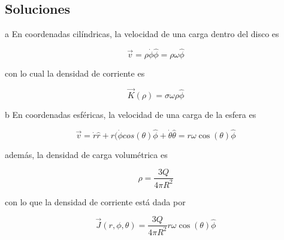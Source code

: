 \subsection{Soluciones}

\begin{solucion}{1}
\ics a
En coordenadas cilíndricas, la velocidad de una carga dentro del disco es

\[\Vec{v}=\rho\dot{\phi}\hat{\phi}=\rho\omega\hat{\phi}\]

con lo cual la densidad de corriente es

\[\Vec{K}(\rho) = \sigma\omega\rho\hat{\phi}\]

\ics b
En coordenadas esféricas, la velocidad de una carga de la esfera es

\[\Vec{v}=\dot{r}\hat{r} + r(\dot{\phi}cos(\theta)\hat{\phi}+\dot{\theta}\hat{\theta}=
r\omega\cos(\theta)\hat{\phi}\]

además, la densidad de carga volumétrica es

\[\rho = \frac{3Q}{4\pi R^2}\]

con lo que la densidad de corriente está dada por

\[\Vec{J}(r,\phi,\theta)=\frac{3Q}{4\pi R^2}r\omega\cos(\theta)\hat{\phi}\]

\end{solucion}

\bigbreak

